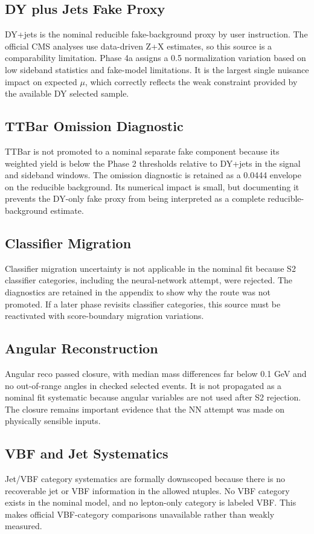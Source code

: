 \documentclass[11pt]{article}
\begin{document}
\subsection{DY plus Jets Fake Proxy}
DY+jets is the nominal reducible fake-background proxy by user instruction. The official CMS analyses use data-driven Z+X estimates, so this source is a comparability limitation. Phase 4a assigns a 0.5 normalization variation based on low sideband statistics and fake-model limitations. It is the largest single nuisance impact on expected $\mu$, which correctly reflects the weak constraint provided by the available DY selected sample.

\subsection{TTBar Omission Diagnostic}
TTBar is not promoted to a nominal separate fake component because its weighted yield is below the Phase 2 thresholds relative to DY+jets in the signal and sideband windows. The omission diagnostic is retained as a 0.0444 envelope on the reducible background. Its numerical impact is small, but documenting it prevents the DY-only fake proxy from being interpreted as a complete reducible-background estimate.

\subsection{Classifier Migration}
Classifier migration uncertainty is not applicable in the nominal fit because S2 classifier categories, including the neural-network attempt, were rejected. The diagnostics are retained in the appendix to show why the route was not promoted. If a later phase revisits classifier categories, this source must be reactivated with score-boundary migration variations.

\subsection{Angular Reconstruction}
Angular reco passed closure, with median mass differences far below 0.1 GeV and no out-of-range angles in checked selected events. It is not propagated as a nominal fit systematic because angular variables are not used after S2 rejection. The closure remains important evidence that the NN attempt was made on physically sensible inputs.

\subsection{VBF and Jet Systematics}
Jet/VBF category systematics are formally downscoped because there is no recoverable jet or VBF information in the allowed ntuples. No VBF category exists in the nominal model, and no lepton-only category is labeled VBF. This makes official VBF-category comparisons unavailable rather than weakly measured.
\end{document}
